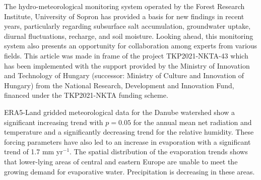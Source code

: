 The hydro-meteorological monitoring system operated by the Forest Research Institute, University of Sopron has provided a basis for new findings in recent years, particularly regarding subsurface salt accumulation, groundwater uptake, diurnal fluctuations, recharge, and soil moisture. Looking ahead, this monitoring system also presents an opportunity for collaboration among experts from various fields.
This article was made in frame of the project TKP2021-NKTA-43 which has been implemented with the support provided by the Ministry of Innovation and Technology of Hungary (successor: Ministry of Culture and Innovation of Hungary) from the National Research, Development and Innovation Fund, financed under the TKP2021-NKTA funding scheme.
\newpage{}
{}
\begin{flushleft}






\end{flushleft}

\noindent

ERA5-Land gridded meteorological data for the Danube watershed show a significant increasing trend with $p=0.05$ for the annual mean net radiation and temperature and a significantly decreasing trend for the relative humidity. These forcing parameters have also led to an increase in evaporation with a significant trend of 1.7 mm yr$^{-1}$. The spatial distribution of the evaporation trends shows that lower-lying areas of central and eastern Europe are unable to meet the growing demand for evaporative water. Precipitation is decreasing in these areas.

